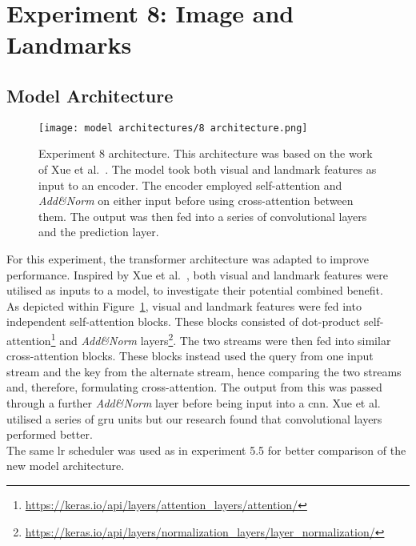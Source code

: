 \section{Experiment 8: Image and Landmarks}
\label{sec: Experiment 8}
\subsection{Model Architecture}
\begin{figure}
\centering
\texttt{[image: model architectures/8 architecture.png]}
\caption[Experiment 8 architecture]{Experiment 8 architecture. This architecture was based on the work of Xue et al.~\cite{lipreading_with_attention}. The model took both visual and landmark features as input to an encoder. The encoder employed self-attention and \emph{Add\&Norm} on either input before using cross-attention between them. The output was then fed into a series of convolutional layers and the prediction layer.}
\label{fig:8 architecture}
\end{figure}
For this experiment, the \gls{transformer} architecture was adapted to improve performance. Inspired by Xue et al.~\cite{lipreading_with_attention}, both visual and landmark features were utilised as inputs to a model, to investigate their potential combined benefit.\\ 
As depicted within Figure~\ref{fig:8 architecture}, visual and landmark features were fed into independent self-attention blocks. These blocks consisted of dot-product self-attention\footnote{\url{https://keras.io/api/layers/attention_layers/attention/}} and \emph{Add\&Norm} layers\footnote{\url{https://keras.io/api/layers/normalization_layers/layer_normalization/}}. The two streams were then fed into similar cross-attention blocks. These blocks instead used the query from one input stream and the key from the alternate stream, hence comparing the two streams and, therefore, formulating cross-attention. The output from this was passed through a further \emph{Add\&Norm} layer before being input into a \acrshort{cnn}. Xue et al. utilised a series of \acrshort{gru} units but our research found that convolutional layers performed better.\\
The same \acrshort{lr} scheduler was used as in experiment 5.5 for better comparison of the new model architecture.
